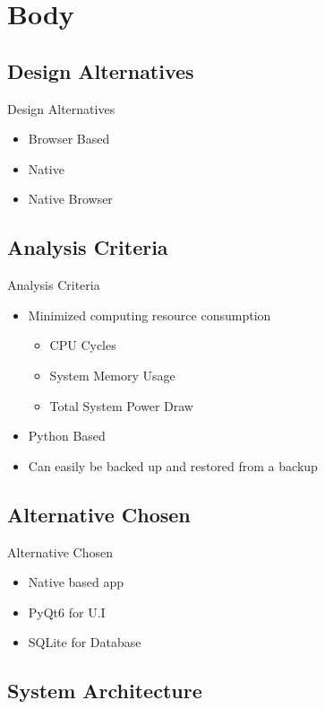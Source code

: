 \documentclass[17pt, aspectratio=169]{beamer}
\begin{document}
\section{Body}
\subsection{Design Alternatives}
\begin{frame}{Design Alternatives}
	\begin{itemize}
		\item Browser Based
		\item Native
		\item Native Browser
	\end{itemize}
\end{frame}
\subsection*{Analysis Criteria}
\begin{frame}{Analysis Criteria}
	\begin{itemize}
		\item Minimized computing resource consumption
		      \begin{itemize}
			      \item CPU Cycles
			      \item System Memory Usage
			      \item Total System Power Draw
		      \end{itemize}
		\item Python Based
		\item Can easily be backed up and restored from a backup
	\end{itemize}
\end{frame}
\subsection*{Alternative Chosen}
\begin{frame}{Alternative Chosen}
	\begin{itemize}
		\item Native based app
		\item PyQt6 for U.I
		\item SQLite for Database
	\end{itemize}
\end{frame}
\subsection{System Architecture}
\end{document}

